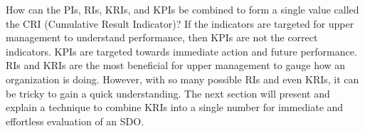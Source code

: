 \documentclass[SDSUThesis.tex]{subfiles}
\begin{document}
        How can the PIs, RIs, KRIs, and KPIs be combined to form a single
        value called the CRI (Cumulative Result Indicator)?  If the indicators
        are targeted for upper management to understand performance, then 
        KPIs are not the correct indicators.  KPIs are targeted towards
        immediate action and future performance.  RIs and KRIs are the most
        beneficial for upper management to gauge how an organization is doing.
        However, with so many possible RIs and even KRIs, it can be tricky
        to gain a quick understanding.  The next section will present
        and explain a technique to combine KRIs into a single number
        for immediate and  effortless evaluation of an SDO.
        
\end{document}
